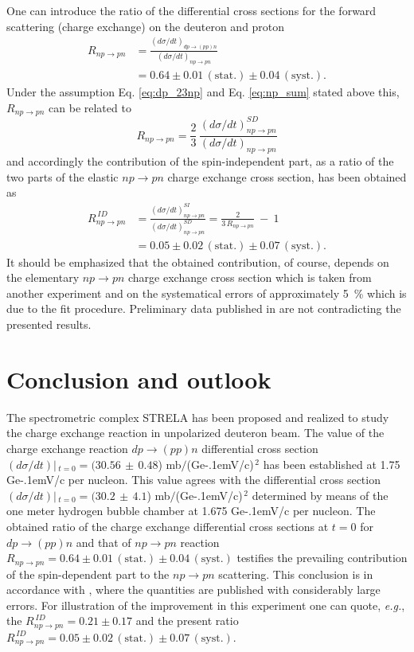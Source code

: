 \documentclass[twocolumn,epjc3]{svjour3}
\newcommand{\np}     {\ensuremath{np \rightarrow pn}\xspace}
\newcommand{\dpchex} {\ensuremath{dp \rightarrow (pp)n}\xspace}
\newcommand{\GeVc}   {Ge\kern-.1emV/c\xspace}
\begin{document}
One can introduce the ratio of the differential cross sections for the forward
scattering (charge exchange) on the deuteron and proton
\begin{equation}
  \begin{split}
    R_{\np} &= \frac{(d\sigma/dt)_{\dpchex}}{(d\sigma/dt)_{\np}} \\
    &= 0.64 \pm 0.01\,\mathrm{(stat.)} \pm 0.04\,\mathrm{(syst.)}.
  \end{split}
\end{equation}
Under the assumption Eq. \eqref{eq:dp_23np} and Eq. \eqref{eq:np_sum} stated
above this, $R_{\np}$ can be related to
\begin{equation}
  R_{\np} = \frac{2}{3}\,\frac{(d\sigma/dt)^{SD}_{\np}}{(d\sigma/dt)_{\np}}
\end{equation}
and accordingly the contribution of the spin-independent part, as a ratio of the
two parts of the elastic \np charge exchange cross section, has been obtained as
\begin{equation}
  \begin{split}
    R^{\,ID}_{\np} &= \frac{(d\sigma/dt)^{SI}_{\np}}{(d\sigma/dt)^{SD}_{\np}}
    = \frac{2}{3\,R_{\np}} \ - \ 1 \\
    &= 0.05 \pm 0.02\,\mathrm{(stat.)} \pm 0.07\,\mathrm{(syst.)}.
  \end{split}
\end{equation}
It should be emphasized that the obtained contribution, of course, depends on
the elementary \np charge exchange cross section which is taken from another
experiment and on the systematical errors of approximately 5~\% which is due to
the fit procedure. Preliminary data published in \cite{bas14,bas16} are not
contradicting the presented results.

\section{Conclusion and outlook}
The spectrometric complex STRELA has been proposed and realized to study the
charge exchange reaction in unpola\-rized deuteron beam. The value of the charge
exchange reaction \dpchex differential cross section
$(d\sigma/dt)|\,_{t=0}=(30.56\,\pm\,0.48$) mb$/$(\GeVc)$^{\,2}$ has been
established at 1.75 \GeVc per nucleon. This value agrees with the differential
cross section $(d\sigma/dt)|\,_{t=0}=(30.2\,\pm\,4.1$) mb$/$(\GeVc)$^{\,2}$
determined by means of the one meter hydrogen bubble chamber at 1.675 \GeVc per
nucleon. The obtained ratio of the charge exchange differential cross sections
at $t=0$ for \dpchex and that of \np reaction
$R_{\np} = 0.64 \pm 0.01\,\mathrm{(stat.)} \pm 0.04\,\mathrm{(syst.)}$ testifies
the prevailing contribution of the spin-dependent part to the \np scattering.
This conclusion is in accordance with \cite{gla08}, where the quantities are
published with considerably large errors. For illustration of the improvement in
this experiment one can quote, \textit{e.g.}, the
$R^{\,ID}_{\np} = 0.21 \pm 0.17$ \cite{gla08} and the present ratio
$R^{\,ID}_{\np} = 0.05 \pm 0.02\,\mathrm{(stat.)} \pm 0.07\,\mathrm{(syst.)}$.
\end{document}
